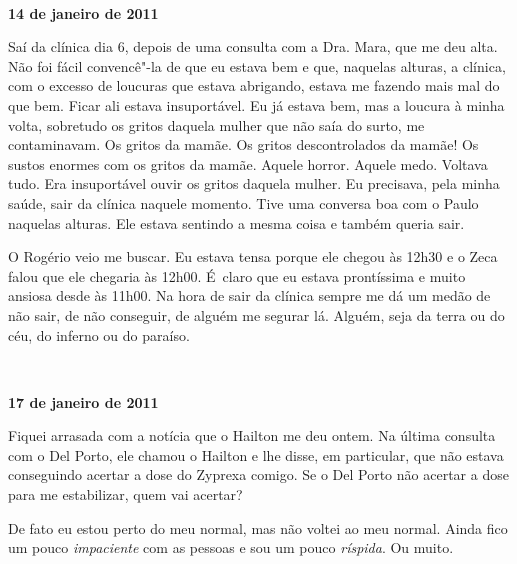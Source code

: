 \begin{center}\asterisc{}​\end{center}

\begin{flushright}\textbf{14 de janeiro de 2011}\end{flushright}


Saí da clínica dia 6, depois de uma consulta com a Dra. Mara, que me deu
alta. Não foi fácil convencê"-la de que eu estava bem e que, naquelas
alturas, a clínica, com o excesso de loucuras que estava abrigando,
estava me fazendo mais mal do que bem. Ficar ali estava insuportável. Eu
já estava bem, mas a loucura à minha volta, sobretudo os gritos daquela
mulher que não saía do surto, me contaminavam. Os gritos da mamãe. Os
gritos descontrolados da mamãe! Os sustos enormes com os gritos da
mamãe. Aquele horror. Aquele medo. Voltava tudo. Era insuportável ouvir
os gritos daquela mulher. Eu precisava, pela minha saúde, sair da
clínica naquele momento. Tive uma conversa boa com o Paulo naquelas
alturas. Ele estava sentindo a mesma coisa e também queria sair.

O Rogério veio me buscar. Eu estava tensa porque ele chegou às 12h30 e o
Zeca falou que ele chegaria às 12h00. É~claro que eu estava prontíssima
e muito ansiosa desde às 11h00. Na hora de sair da clínica sempre me dá
um medão de não sair, de não conseguir, de alguém me segurar lá. Alguém,
seja da terra ou do céu, do inferno ou do paraíso.



\begin{center}\asterisc{}​\end{center}

\begin{flushright}\textbf{}\end{flushright}

\begin{flushright}\textbf{17 de janeiro de 2011}\end{flushright}


Fiquei arrasada com a notícia que o Hailton me deu ontem. Na última
consulta com o Del Porto, ele chamou o Hailton e lhe disse, em
particular, que não estava conseguindo acertar a dose do Zyprexa comigo.
Se o Del Porto não acertar a dose para me estabilizar, quem vai acertar?

De fato eu estou perto do meu normal, mas não voltei ao meu normal.
Ainda fico um pouco \emph{impaciente} com as pessoas e sou um pouco
\emph{ríspida}. Ou muito.

